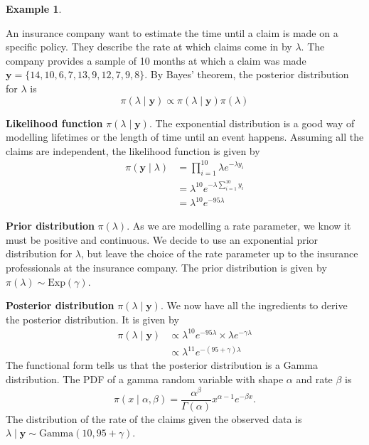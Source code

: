 \documentclass[
]{book}
\theoremstyle{definition}
\theoremstyle{definition}
\newtheorem{example}{Example}[chapter]
\theoremstyle{definition}
\theoremstyle{definition}
\theoremstyle{remark}
\begin{document}
\begin{example}
\protect\hypertarget{exm:exponential}{}\label{exm:exponential}

An insurance company want to estimate the time until a claim is made on a specific policy. They describe the rate at which claims come in by \(\lambda\). The company provides a sample of 10 months at which a claim was made \(\boldsymbol{y} = \{14, 10, 6, 7, 13, 9, 12, 7, 9, 8\}\). By Bayes' theorem, the posterior distribution for \(\lambda\) is
\[
\pi(\lambda \mid \boldsymbol{y}) \propto \pi(\lambda \mid \boldsymbol{y}) \pi(\lambda)
\]

\textbf{Likelihood function} \(\pi(\lambda \mid \boldsymbol{y})\). The exponential distribution is a good way of modelling lifetimes or the length of time until an event happens. Assuming all the claims are independent, the likelihood function is given by
\begin{align*}
\pi(\boldsymbol{y} \mid \lambda) &= \prod_{i=1}^{10} \lambda e^{-\lambda y_i} \\
& = \lambda^{10}e^{-\lambda \sum_{i=1}^{10} y_i} \\
& = \lambda^{10} e^{-95\lambda}
\end{align*}

\textbf{Prior distribution} \(\pi(\lambda)\). As we are modelling a rate parameter, we know it must be positive and continuous. We decide to use an exponential prior distribution for \(\lambda\), but leave the choice of the rate parameter up to the insurance professionals at the insurance company. The prior distribution is given by \(\pi(\lambda) \sim \textrm{Exp}(\gamma).\)

\textbf{Posterior distribution} \(\pi(\lambda \mid \boldsymbol{y})\). We now have all the ingredients to derive the posterior distribution. It is given by
\begin{align*}
\pi(\lambda \mid \boldsymbol{y}) &\propto \lambda^{10} e^{-95\lambda} \times \lambda e^{-\gamma\lambda} \\
& \propto \lambda^{11}e^{-(95 + \gamma)\lambda}
\end{align*}
The functional form tells us that the posterior distribution is a Gamma distribution. The PDF of a gamma random variable with shape \(\alpha\) and rate \(\beta\) is
\[
\pi(x \mid \alpha, \beta) = \frac{\alpha^\beta}{\Gamma(\alpha)}x^{\alpha-1}e^{-\beta x}.
\]
The distribution of the rate of the claims given the observed data is \(\lambda \mid \boldsymbol{y} \sim \textrm{Gamma}(10, 95 + \gamma)\).


\end{example}
\end{document}
